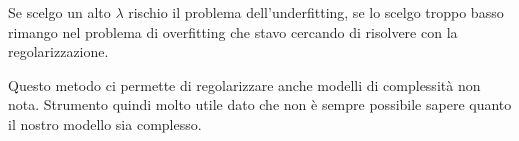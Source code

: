 Se scelgo un alto $\lambda$ rischio il problema dell'underfitting, se lo scelgo troppo basso rimango nel problema di
overfitting che stavo cercando di risolvere con la regolarizzazione.

Questo metodo ci permette di regolarizzare anche modelli di complessit\`a non nota. Strumento quindi molto utile dato
che non \`e sempre possibile sapere quanto il nostro modello sia complesso.
